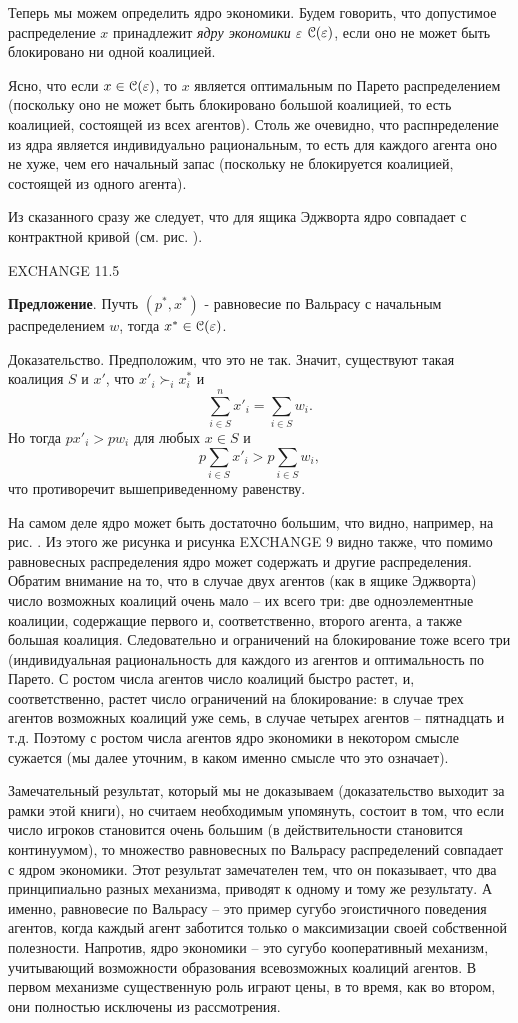 Теперь мы можем определить ядро экономики. Будем говорить, что допустимое распределение $x$
принадлежит \emph{ядру экономики $\varepsilon$}  ${\cal C}(\varepsilon )$, если оно не
может быть блокировано ни одной коалицией.

Ясно, что если $x\in {\cal
C}(\varepsilon )$, то $x$ является оптимальным по Парето распределением
(поскольку оно не может быть блокировано большой коалицией, то есть коалицией,
состоящей из всех агентов). Столь же очевидно, что распнределение из ядра
является индивидуально рациональным, то есть для каждого агента оно не хуже, чем
его начальный запас (поскольку не блокируется коалицией, состоящей из одного агента).

Из сказанного сразу же следует, что для ящика Эджворта ядро совпадает с контрактной кривой
(см. рис.    ).

EXCHANGE 11.5

{\bf Предложение}. Пучть $(p^*,x^*)$ -  равновесие по Вальрасу с
начальным распределением $w$, тогда $x^*\in {\cal C}(\varepsilon )$.

Доказательство. Предположим, что это не так. Значит, существуют такая коалиция $S$
и $x'$, что $x'_i\succ_i x^*_i$ и
$$
\sum^n_{i\in S}x'_i=\sum_{i\in S}w_i.
$$
Но тогда $px'_i>pw_i$ для любых $x\in S$ и
$$
p\sum_{i\in S}x'_i>p\sum_{i\in S}w_i,
$$
что противоречит вышеприведенному равенству.

На самом деле ядро может быть достаточно большим, что видно, например, на рис.   .
Из этого же рисунка и рисунка EXCHANGE 9 видно также, что помимо равновесных
распределения ядро может содержать и другие распределения. Обратим внимание на то, что
в случае двух агентов (как в ящике Эджворта) число возможных коалиций очень мало -- их
всего три: две одноэлементные коалиции, содержащие первого и, соответственно, второго
агента, а также большая коалиция. Следовательно и ограничений на блокирование тоже всего три
(индивидуальная рациональность для каждого из агентов и оптимальность по Парето.
С ростом числа агентов число коалиций быстро растет, и, соответственно, растет число
ограничений на блокирование: в случае трех агентов возможных коалиций уже семь, в случае
четырех агентов -- пятнадцать и т.д. Поэтому с ростом числа агентов ядро экономики в некотором
смысле сужается (мы далее уточним, в каком именно смысле
что это означает).

Замечательный результат, который мы не доказываем (доказательство выходит за рамки
этой книги), но считаем необходимым
упомянуть, состоит в том, что если число игроков становится очень большим (в действительности
становится континуумом), то множество равновесных по Вальрасу распределений
совпадает с ядром экономики. Этот результат замечателен тем, что он показывает,
что два принципиально разных механизма, приводят к одному и тому же результату.
А именно, равновесие по Вальрасу -- это пример сугубо эгоистичного поведения агентов,
когда каждый агент заботится только о максимизации своей собственной полезности.
Напротив, ядро экономики -- это сугубо кооперативный механизм, учитывающий
возможности образования всевозможных коалиций агентов. В первом механизме
существенную роль играют цены, в то время, как во втором, они полностью исключены
из рассмотрения.

